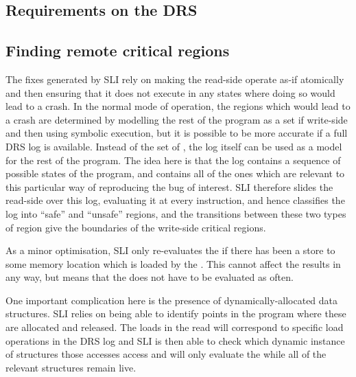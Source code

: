 
\subsection{Requirements on the DRS}

\subsection{Finding remote critical regions}

The fixes generated by SLI rely on making the read-side \StateMachine operate as-if atomically and then ensuring that it does not execute in any states where doing so would lead to a crash.
In the normal mode of operation, the regions which would lead to a crash are determined by modelling the rest of the program as a set if write-side \StateMachines and then using symbolic execution, but it is possible to be more accurate if a full DRS log is available.
Instead of the set of \StateMachines, the log itself can be used as a model for the rest of the program.
The idea here is that the log contains a sequence of possible states of the program, and contains all of the ones which are relevant to this particular way of reproducing the bug of interest.
SLI therefore slides the read-side \StateMachine over this log, evaluating it at every instruction, and hence classifies the log into ``safe'' and ``unsafe'' regions, and the transitions between these two types of region give the boundaries of the write-side critical regions.

As a minor optimisation, SLI only re-evaluates the \StateMachine if there has been a store to some memory location which is loaded by the \StateMachine.
This cannot affect the results in any way, but means that the \StateMachine does not have to be evaluated as often.

One important complication here is the presence of dynamically-allocated data structures.
SLI relies on being able to identify points in the program where these are allocated and released.
The loads in the read \StateMachine will correspond to specific load operations in the DRS log and SLI is then able to check which dynamic instance of structures those accesses access and will only evaluate the \StateMachine while all of the relevant structures remain live.

